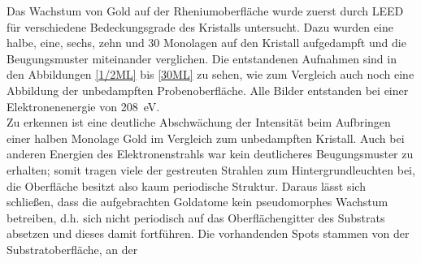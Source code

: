 Das Wachstum von Gold auf der Rheniumoberfläche wurde zuerst durch LEED für
verschiedene Bedeckungsgrade des Kristalls untersucht. Dazu wurden eine halbe, eine, sechs, zehn und
30 Monolagen auf den Kristall aufgedampft und die Beugungsmuster miteinander verglichen. Die
entstandenen Aufnahmen sind in den Abbildungen \ref{1/2ML} bis \ref{30ML} zu sehen, wie zum
Vergleich auch noch eine Abbildung der unbedampften Probenoberfläche. Alle Bilder entstanden
bei einer Elektronenenergie von \SI{208}{eV}.
\\
Zu erkennen ist eine deutliche Abschwächung der Intensität beim
Aufbringen einer halben Monolage Gold im Vergleich zum unbedampften Kristall. Auch bei anderen Energien des
Elektronenstrahls war kein deutlicheres Beugungsmuster zu erhalten; somit tragen viele der
gestreuten Strahlen zum Hintergrundleuchten bei, die Oberfläche besitzt also kaum periodische
Struktur.
Daraus lässt sich schließen, dass die aufgebrachten Goldatome kein pseudomorphes Wachstum betreiben, d.h.
sich nicht periodisch auf das Oberflächengitter des Substrats absetzen und dieses damit fortführen.
Die vorhandenden Spots stammen von der Substratoberfläche, an der 
